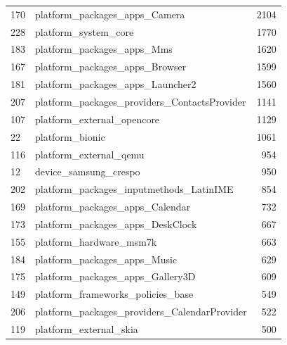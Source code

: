\documentclass[a4paper,10pt]{article}
\numberwithin{equation}{subsection}
\begin{document}
\begin{table}
\begin{tabularx}{\textwidth}{ | X | l | r |}
170 & platform\_packages\_apps\_Camera & 2104\\ 
228 & platform\_system\_core & 1770\\ 
183 & platform\_packages\_apps\_Mms & 1620\\ 
167 & platform\_packages\_apps\_Browser & 1599\\ 
181 & platform\_packages\_apps\_Launcher2 & 1560\\ 
207 & platform\_packages\_providers\_ContactsProvider & 1141\\ 
107 & platform\_external\_opencore & 1129\\ 
22 & platform\_bionic & 1061\\ 
116 & platform\_external\_qemu & 954\\
12 & device\_samsung\_crespo & 950\\ 
202 & platform\_packages\_inputmethods\_LatinIME & 854\\ 
169 & platform\_packages\_apps\_Calendar & 732\\ 
173 & platform\_packages\_apps\_DeskClock & 667\\ 
155 & platform\_hardware\_msm7k & 663\\ 
184 & platform\_packages\_apps\_Music & 629\\ 
175 & platform\_packages\_apps\_Gallery3D & 609\\ 
149 & platform\_frameworks\_policies\_base & 549\\ 
206 & platform\_packages\_providers\_CalendarProvider & 522\\ 
119 & platform\_external\_skia & 500\\
  \hline  
  \end{tabularx}
\end{table}
\end{document}
